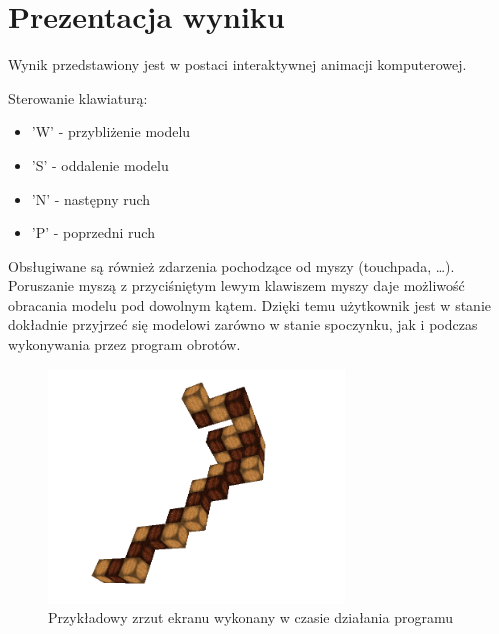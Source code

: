 \section{Prezentacja wyniku}

Wynik przedstawiony jest w postaci interaktywnej animacji komputerowej.

Sterowanie klawiaturą:
\begin{itemize}
\item 'W' - przybliżenie modelu
\item 'S' - oddalenie modelu
\item 'N' - następny ruch
\item 'P' - poprzedni ruch
\end{itemize}

Obsługiwane są również zdarzenia pochodzące od myszy (touchpada, \ldots). Poruszanie myszą z przyciśniętym lewym klawiszem myszy daje możliwość obracania modelu pod dowolnym kątem. Dzięki temu użytkownik jest w stanie dokładnie przyjrzeć się modelowi zarówno w stanie spoczynku, jak i podczas wykonywania przez program obrotów.

\begin{figure}[h]
    \centering
    \includegraphics[width=0.7\textwidth]{using}
    \caption{Przykładowy zrzut ekranu wykonany w czasie działania programu}
    \label{fig:using1}
\end{figure}